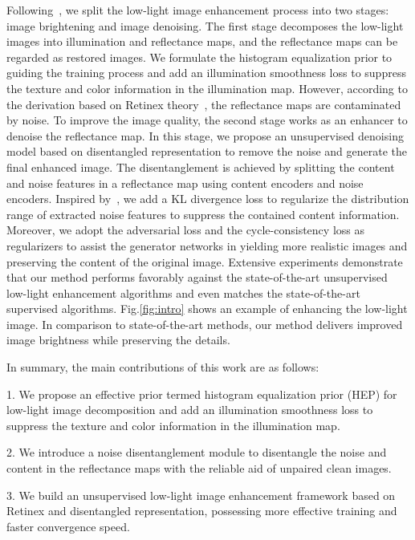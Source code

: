 \documentclass[journal]{IEEEtran}
\begin{document}
Following~\cite{Chen2018Retinex}, we split the low-light image enhancement process into two stages: image brightening and image denoising. The first stage decomposes the low-light images into illumination and reflectance maps, and the reflectance maps can be regarded as restored images. We formulate the histogram equalization prior to guiding the training process and add an illumination smoothness loss to suppress the texture and color information in the illumination map. However, according to the derivation based on Retinex theory~\cite{zhang2021beyond}, the reflectance maps are contaminated by noise. To improve the image quality, the second stage works as an enhancer to denoise the reflectance map. In this stage, we propose an unsupervised denoising model based on disentangled representation to remove the noise and generate the final enhanced image. The disentanglement is achieved by splitting the content and noise features in a reflectance map using content encoders and noise encoders. Inspired by~\cite{bao2018towards}, we add a KL divergence loss to regularize the distribution range of extracted noise features to suppress the contained content information. Moreover, we adopt the adversarial loss and the cycle-consistency loss as regularizers to assist the generator networks in yielding more realistic images and preserving the content of the original image. Extensive experiments demonstrate that our method performs favorably against the state-of-the-art unsupervised low-light enhancement algorithms and even matches the state-of-the-art supervised algorithms. Fig.\ref{fig:intro} shows an example of enhancing the low-light image. In comparison to state-of-the-art methods, our method delivers improved image brightness while preserving the details.

In summary, the main contributions of this work are as follows:

1. We propose an effective prior termed histogram equalization prior (HEP) for low-light image decomposition and add an illumination smoothness loss to suppress the texture and color information in the illumination map.

2. We introduce a noise disentanglement module to disentangle the noise and content in the reflectance maps with the reliable aid of unpaired clean images.

3. We build an unsupervised low-light image enhancement framework based on Retinex and disentangled representation, possessing more effective training and faster convergence speed.
\end{document}

